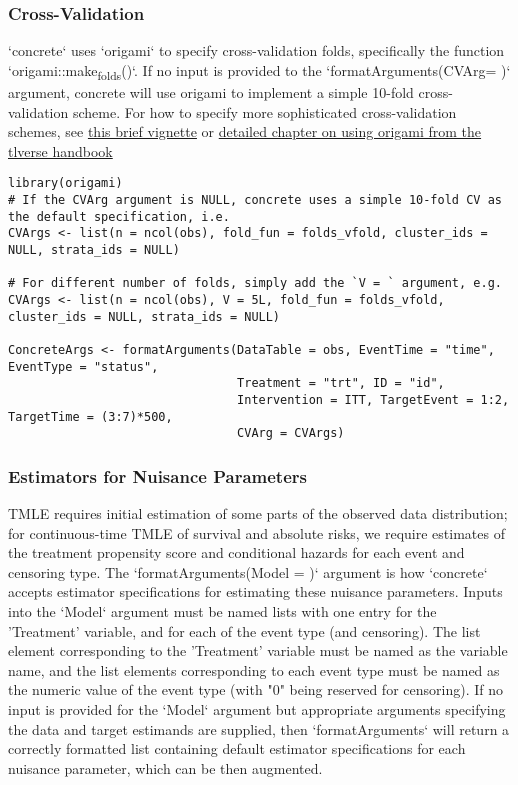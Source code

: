\documentclass{report}
\newcommand{\1}{\ensuremath{\mathbf{1}}}
\begin{document}
\subsubsection{Cross-Validation}

`concrete` uses `origami` to specify cross-validation folds, specifically the function `origami::make\textsubscript{folds}()`. If no input is provided to the `formatArguments(CVArg= )` argument, concrete will use origami to implement a simple 10-fold cross-validation scheme. For how to specify more sophisticated cross-validation schemes, see \href{https://tlverse.org/origami/articles/generalizedCV.html}{this brief vignette} or \href{https://tlverse.org/tlverse-handbook/origami.html}{detailed chapter on using origami from the tlverse handbook}

\begin{lstlisting}
library(origami)
# If the CVArg argument is NULL, concrete uses a simple 10-fold CV as the default specification, i.e.
CVArgs <- list(n = ncol(obs), fold_fun = folds_vfold, cluster_ids = NULL, strata_ids = NULL)

# For different number of folds, simply add the `V = ` argument, e.g. 
CVArgs <- list(n = ncol(obs), V = 5L, fold_fun = folds_vfold, cluster_ids = NULL, strata_ids = NULL)

ConcreteArgs <- formatArguments(DataTable = obs, EventTime = "time", EventType = "status", 
                                Treatment = "trt", ID = "id", 
                                Intervention = ITT, TargetEvent = 1:2, TargetTime = (3:7)*500, 
                                CVArg = CVArgs)
\end{lstlisting}

\subsubsection{Estimators for Nuisance Parameters}
TMLE requires initial estimation of some parts of the observed data distribution; for continuous-time TMLE of survival and absolute risks, we require estimates of the treatment propensity score and conditional hazards for each event and censoring type. The `formatArguments(Model = )` argument is how `concrete` accepts estimator specifications for estimating these nuisance parameters. Inputs into the `Model` argument must be named lists with one entry for the 'Treatment' variable, and for each of the event type (and censoring). The list element corresponding to the 'Treatment' variable must be named as the variable name, and the list elements corresponding to each event type must be named as the numeric value of the event type (with "0" being reserved for censoring). If no input is provided for the `Model` argument but appropriate arguments specifying the data and target estimands are supplied, then `formatArguments` will return a correctly formatted list containing default estimator specifications for each nuisance parameter, which can be then augmented.
\end{document}
